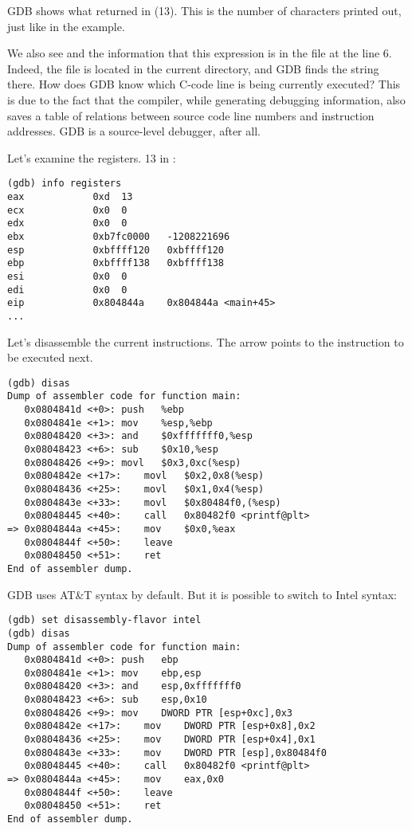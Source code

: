 \ac{GDB} shows what \printf returned in \EAX (13).
This is the number of characters printed out, just like in the \olly example.

We also see  and the information that this expression is in the  file at the line 6.
Indeed, the  file is located in the current directory, and \ac{GDB} finds the string there.
How does \ac{GDB} know which C-code line is being currently executed?
This is due to the fact that the compiler,
while generating debugging information, also saves a table of relations between source code line
numbers and instruction addresses.
GDB is a source-level debugger, after all.

Let's examine the registers.
13 in \EAX:

\begin{lstlisting}
(gdb) info registers
eax            0xd	13
ecx            0x0	0
edx            0x0	0
ebx            0xb7fc0000	-1208221696
esp            0xbffff120	0xbffff120
ebp            0xbffff138	0xbffff138
esi            0x0	0
edi            0x0	0
eip            0x804844a	0x804844a <main+45>
...
\end{lstlisting}

Let's disassemble the current instructions.
The arrow points to the instruction to be executed next.

\begin{lstlisting}
(gdb) disas
Dump of assembler code for function main:
   0x0804841d <+0>:	push   %ebp
   0x0804841e <+1>:	mov    %esp,%ebp
   0x08048420 <+3>:	and    $0xfffffff0,%esp
   0x08048423 <+6>:	sub    $0x10,%esp
   0x08048426 <+9>:	movl   $0x3,0xc(%esp)
   0x0804842e <+17>:	movl   $0x2,0x8(%esp)
   0x08048436 <+25>:	movl   $0x1,0x4(%esp)
   0x0804843e <+33>:	movl   $0x80484f0,(%esp)
   0x08048445 <+40>:	call   0x80482f0 <printf@plt>
=> 0x0804844a <+45>:	mov    $0x0,%eax
   0x0804844f <+50>:	leave  
   0x08048450 <+51>:	ret    
End of assembler dump.
\end{lstlisting}

\ac{GDB} uses AT\&T syntax by default.
But it is possible to switch to Intel syntax:

\begin{lstlisting}
(gdb) set disassembly-flavor intel
(gdb) disas
Dump of assembler code for function main:
   0x0804841d <+0>:	push   ebp
   0x0804841e <+1>:	mov    ebp,esp
   0x08048420 <+3>:	and    esp,0xfffffff0
   0x08048423 <+6>:	sub    esp,0x10
   0x08048426 <+9>:	mov    DWORD PTR [esp+0xc],0x3
   0x0804842e <+17>:	mov    DWORD PTR [esp+0x8],0x2
   0x08048436 <+25>:	mov    DWORD PTR [esp+0x4],0x1
   0x0804843e <+33>:	mov    DWORD PTR [esp],0x80484f0
   0x08048445 <+40>:	call   0x80482f0 <printf@plt>
=> 0x0804844a <+45>:	mov    eax,0x0
   0x0804844f <+50>:	leave  
   0x08048450 <+51>:	ret    
End of assembler dump.
\end{lstlisting}

